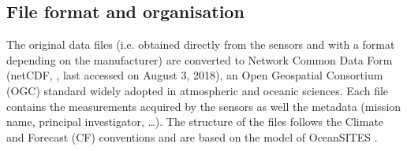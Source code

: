 \documentclass[essd,manuscript]{copernicus}
\begin{document}
\subsection{File format and organisation}

The original data files (i.e. obtained directly from the sensors and with a format depending on the manufacturer) are converted to Network Common Data Form (netCDF, , last accessed on August 3, 2018), an Open Geospatial Consortium (OGC) standard widely adopted in atmospheric and oceanic sciences. Each file contains the measurements acquired by the sensors as well the metadata (mission name, principal investigator, \ldots). The structure of the files follows the Climate and Forecast (CF) conventions \citep{DOMENICO13} and are based on the model of OceanSITES \citep{SEND2010}. 
\end{document}
